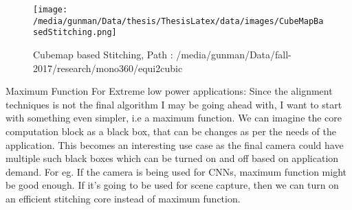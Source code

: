 \begin{figure*}
	\begin{center}
		\texttt{[image: /media/gunman/Data/thesis/ThesisLatex/data/images/CubeMapBasedStitching.png]}
		\caption{Cubemap based Stitching, Path : /media/gunman/Data/fall-2017/research/mono360/equi2cubic}
		\label{ODS_Input_Output}
	\end{center}
	\vspace{-0.3in}
\end{figure*} 

Maximum Function For Extreme low power applications:
Since the alignment techniques is not the final algorithm I may be going ahead with, I want to start with something even simpler, i.e a maximum function. We can imagine the core computation block as a black box, that can be changes as per the needs of the application. This becomes an interesting use case as the final camera could have multiple such black boxes which can be turned on and off based on application demand. For eg. If the camera is being used for CNNs, maximum function might be good enough. If it’s going to be used for scene capture, then we can turn on an efficient stitching core instead of maximum function.





